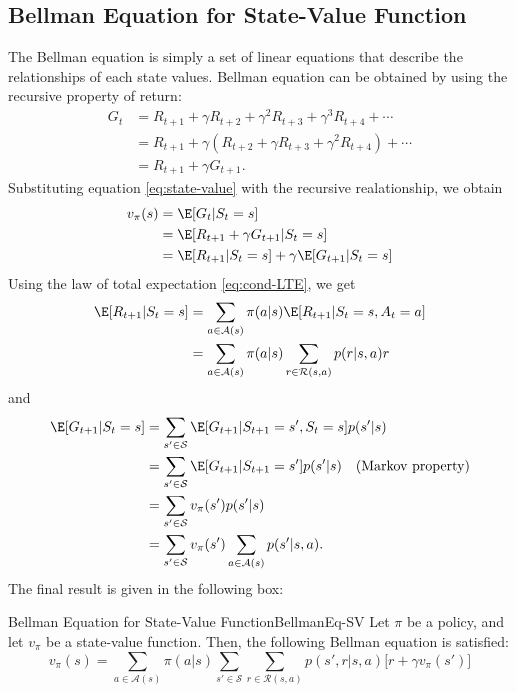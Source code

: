     \subsection{Bellman Equation for State-Value Function}
        The Bellman equation is simply a set of linear equations that describe the relationships of each state values.
        Bellman equation can be obtained by using the recursive property of return:
        \begin{align}
            G_t &= R_{t+1} + \gamma R_{t+2} + \gamma^2 R_{t+3} + \gamma^3 R_{t+4} + \cdots \\
                &= R_{t+1} + \gamma (R_{t+2} + \gamma R_{t+3} + \gamma^2 R_{t+4}) + \cdots \\
                &= R_{t+1} + \gamma G_{t+1}.
        \end{align}
        Substituting equation \ref{eq:state-value} with the recursive realationship, we obtain
        \begin{align}
            v_\pi(s) &= \E[G_t|S_t=s] \\
                     &= \E[R_{t+1} + \gamma G_{t+1}|S_t=s] \\
                     &= \E[R_{t+1}|S_t=s] + \gamma \E[G_{t+1}|S_t=s]
        \end{align} 
        Using the law of total expectation \ref{eq:cond-LTE}, we get
        \begin{align}
            \E[R_{t+1}|S_t=s] &= \sum_{a \in \mathcal{A}(s)}\pi(a|s)\E[R_{t+1}|S_t=s,A_t=a] \\
                              &= \sum_{a \in \mathcal{A}(s)}\pi(a|s)\sum_{r \in \mathcal{R}(s,a)}p(r|s,a)r
        \end{align}
        and
        \begin{align}
            \E[G_{t+1}|S_t=s] &= \sum_{s' \in \mathcal{S}}\E[G_{t+1}|S_{t+1}=s',S_t=s]p(s'|s) \\
                              &= \sum_{s' \in \mathcal{S}}\E[G_{t+1}|S_{t+1}=s']p(s'|s) \quad \text{(Markov property)} \\
                              &= \sum_{s' \in \mathcal{S}}v_\pi(s')p(s'|s) \\
                              &= \sum_{s' \in \mathcal{S}}v_\pi(s')\sum_{a \in \mathcal{A}(s)}p(s'|s,a).
        \end{align}
        The final result is given in the following box:
        \begin{thm}{Bellman Equation for State-Value Function}{BellmanEq-SV}
            Let $\pi$ be a policy, and let $v_\pi$ be a state-value function. Then, the following Bellman equation is satisfied:
            \begin{equation}
                v_\pi(s) = \sum_{a \in \mathcal{A}(s)}\pi(a|s)\sum_{s' \in \mathcal{S}}\sum_{r \in \mathcal{R}(s,a)}p(s',r|s,a)\big[ r + \gamma v_\pi(s') \big]
            \end{equation}
        \end{thm}
